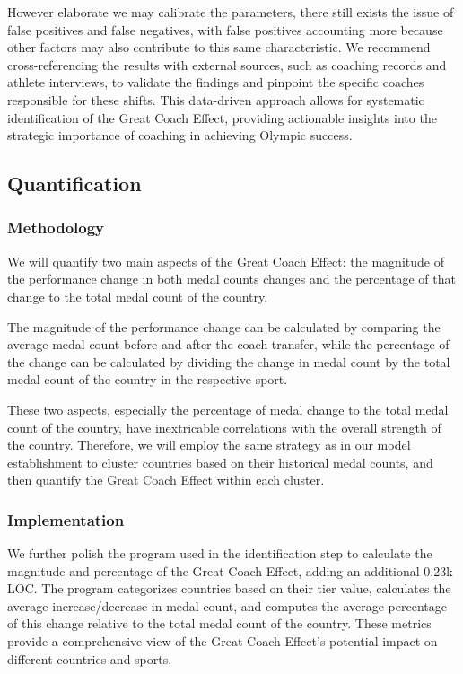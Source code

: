 \documentclass{mcmthesis}
\begin{document}
However elaborate we may calibrate the parameters, there still exists the issue of false positives and false negatives, with false positives accounting more because other factors may also contribute to this same characteristic. We recommend cross-referencing the results with external sources, such as coaching records and athlete interviews, to validate the findings and pinpoint the specific coaches responsible for these shifts. This data-driven approach allows for systematic identification of the Great Coach Effect, providing actionable insights into the strategic importance of coaching in achieving Olympic success.

\subsection{Quantification}

\subsubsection{Methodology}

We will quantify two main aspects of the Great Coach Effect: the magnitude of the performance change in both medal counts changes and the percentage of that change to the total medal count of the country.

The magnitude of the performance change can be calculated by comparing the average medal count before and after the coach transfer, while the percentage of the change can be calculated by dividing the change in medal count by the total medal count of the country in the respective sport.

These two aspects, especially the percentage of medal change to the total medal count of the country, have inextricable correlations with the overall strength of the country. Therefore, we will employ the same strategy as in our model establishment to cluster countries based on their historical medal counts, and then quantify the Great Coach Effect within each cluster.


\subsubsection{Implementation}

We further polish the program used in the identification step to calculate the magnitude and percentage of the Great Coach Effect, adding an additional 0.23k LOC. The program categorizes countries based on their tier value, calculates the average increase/decrease in medal count, and computes the average percentage of this change relative to the total medal count of the country. These metrics provide a comprehensive view of the Great Coach Effect's potential impact on different countries and sports.
\end{document}
